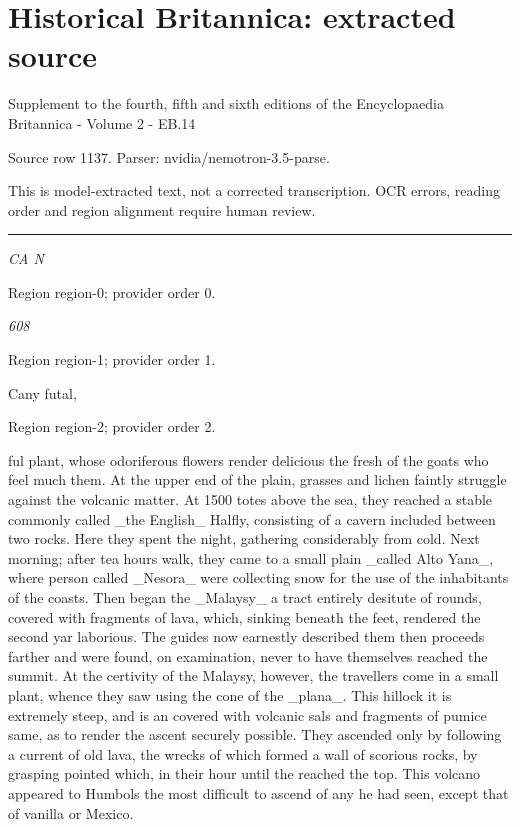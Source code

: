\documentclass[11pt]{article}
\begin{document}
\section*{Historical Britannica: extracted source}
Supplement to the fourth, fifth and sixth editions of the Encyclopaedia Britannica - Volume 2 - EB.14\par
{\small Source row 1137. Parser: nvidia/nemotron-3.5-parse.\par}
{\small This is model-extracted text, not a corrected transcription. OCR errors, reading order and region alignment require human review.\par}
\hrule\medskip
{\small\itshape CA N\par}

{\scriptsize\color{gray} Region region-0; provider order 0.\par}
\medskip

{\small\itshape 608\par}

{\scriptsize\color{gray} Region region-1; provider order 1.\par}
\medskip

Cany futal,
\par

{\scriptsize\color{gray} Region region-2; provider order 2.\par}
\medskip

ful plant, whose odoriferous flowers render delicious the fresh of the goats who feel much them. At the upper end of the plain, grasses and lichen faintly struggle against the volcanic matter. At 1500 totes above the sea, they reached a stable commonly called \_the English\_ Halfly, consisting of a cavern included between two rocks. Here they spent the night, gathering considerably from cold. Next morning; after tea hours walk, they came to a small plain \_called Alto Yana\_, where person called \_Nesora\_ were collecting snow for the use of the inhabitants of the coasts. Then began the \_Malaysy\_ a tract entirely desitute of rounds, covered with fragments of lava, which, sinking beneath the feet, rendered the second yar laborious. The guides now earnestly described them then proceeds farther and were found, on examination, never to have themselves reached the summit. At the certivity of the Malaysy, however, the travellers come in a small plant, whence they saw using the cone of the \_plana\_. This hillock it is extremely steep, and is an covered with volcanic sals and fragments of pumice same, as to render the ascent securely possible. They ascended only by following a current of old lava, the wrecks of which formed a wall of scorious rocks, by grasping pointed which, in their hour until the reached the top. This volcano appeared to Humbols the most difficult to ascend of any he had seen, except that of vanilla or Mexico.
\par
\end{document}
